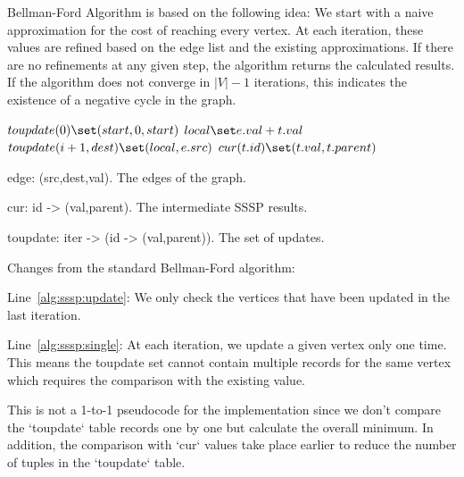 Bellman-Ford Algorithm \cite{bellman1958routing,ford1956network} is based on the following idea: We start with a naive approximation for the cost of reaching every vertex. At each iteration, these values are refined based on the edge list and the existing approximations. If there are no refinements at any given step, the algorithm returns the calculated results. If the algorithm does not converge in $|V|-1$ iterations, this indicates the existence of a negative cycle in the graph.


\begin{algorithm} \label{alg:sssp}
\begin{algorithmic}[1]
	\State $toupdate(0) \set (start,0,start)$
		 \label{alg:sssp:update}
		 		\State $local \set e.val + t.val$
		 		 \label{alg:sssp:single}
		 			\State $toupdate(i+1,dest) \set (local,e.src)$
		 		\EndIf
			\EndFor
		\EndFor
		 		\State $cur(t.id) \set (t.val,t.parent)$
		 	\EndIf
		\EndFor
	\EndFor
\end{algorithmic}
\end{algorithm}

\begin{description}
\item edge: (src,dest,val). The edges of the graph.
\item cur: id -> (val,parent). The intermediate SSSP results.
\item toupdate: iter -> (id -> (val,parent)). The set of updates.
\end{description}

Changes from the standard Bellman-Ford algorithm:

\begin{description}
\item Line~\ref{alg:sssp:update}: We only check the vertices that have been updated in the last iteration.
\item Line~\ref{alg:sssp:single}: At each iteration, we update a given vertex only one time. This means the toupdate set cannot contain multiple records for the same vertex which requires the comparison with the existing value.
\end{description}

This is not a 1-to-1 pseudocode for the implementation since we don't compare the `toupdate` table records one by one but calculate the overall minimum. In addition, the comparison with `cur` values take place earlier to reduce the number of tuples in the `toupdate` table.

